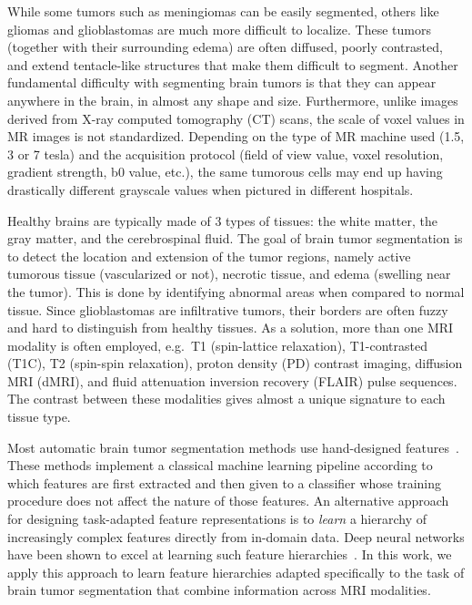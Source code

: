 \documentclass[final,5p,times,twocolumn]{elsarticle}
\begin{document}
While some tumors such as meningiomas can be easily segmented, others like gliomas and glioblastomas are much more difficult to localize.  These tumors (together with their surrounding edema) are often diffused, poorly contrasted, and extend tentacle-like structures that make them difficult to segment.  Another fundamental difficulty with segmenting brain tumors is that they can appear anywhere in the brain, in almost any shape and size.  
Furthermore, unlike images derived from X-ray computed tomography (CT) scans, the scale of voxel values in MR images is not standardized.
Depending on the type of MR machine used (1.5, 3 or 7 tesla) and the acquisition protocol (field of view value, voxel resolution, gradient strength, b0 value, etc.), the same tumorous cells may end up having drastically different grayscale values when pictured in different hospitals.





Healthy brains are typically made of 3 types of tissues: the white matter, the gray matter, and the cerebrospinal fluid.  The goal of brain tumor segmentation is to detect the location and extension of the tumor regions, namely active tumorous tissue (vascularized or not), necrotic tissue, and edema (swelling near the tumor). This is done by identifying abnormal areas when compared to normal tissue.  Since glioblastomas are infiltrative tumors, their borders are often fuzzy and hard to distinguish from healthy tissues.  As a solution, more than one MRI modality is often employed, e.g.\ T1 (spin-lattice relaxation), T1-contrasted (T1C), T2 (spin-spin relaxation), proton density (PD) contrast imaging, diffusion MRI (dMRI), and fluid attenuation inversion recovery (FLAIR) pulse sequences. The contrast between these modalities gives almost a unique signature to each tissue type.



 Most automatic brain tumor segmentation methods use hand-designed features~\citep{braintumorsegmentationdotorg,Menze2014}.  These methods implement a classical machine learning pipeline according to which features are first extracted and then given to a classifier whose training procedure does not affect the nature of those features. An alternative approach for designing task-adapted feature representations is to {\it learn} a hierarchy of increasingly complex features directly from in-domain data. Deep neural networks have been shown to excel at learning such feature hierarchies~\citep{bengio2013}.  In this work, we apply this approach to learn feature hierarchies adapted specifically to the task of brain tumor segmentation that combine information across MRI modalities.
\end{document}
